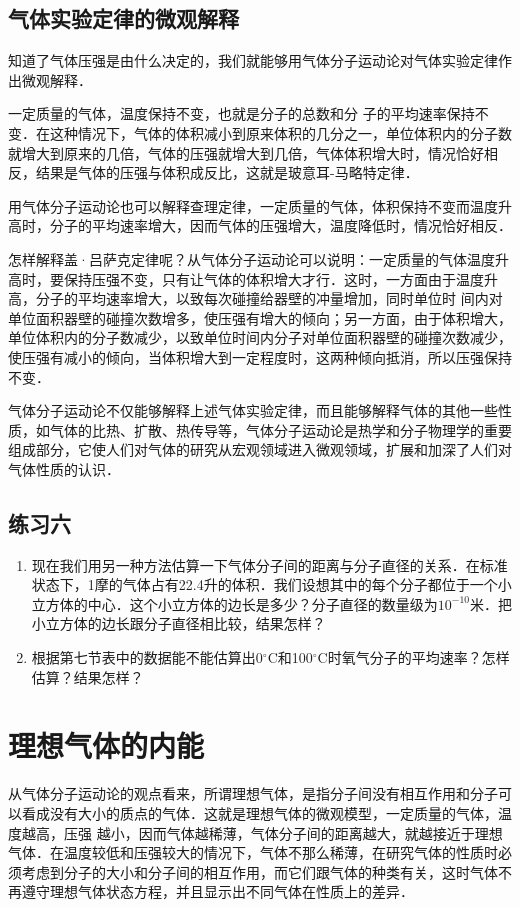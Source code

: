\subsection{气体实验定律的微观解释} 
知道了气体压强是由什么决定的，我们就能够用气体分子运动论对气体实验定律作出微观解释．

一定质量的气体，温度保持不变，也就是分子的总数和分
子的平均速率保持不变．在这种情况下，气体的体积减小到原来体积的几分之一，单位体积内的分子数就增大到原来的几倍，气体的压强就增大到几倍，气体体积增大时，情况恰好相反，结果是气体的压强与体积成反比，这就是玻意耳-马略特定律．

用气体分子运动论也可以解释查理定律，一定质量的气体，体积保持不变而温度升高时，分子的平均速率增大，因而气体的压强增大，温度降低时，情况恰好相反．

怎样解释盖·吕萨克定律呢？从气体分子运动论可以说明：一定质量的气体温度升高时，要保持压强不变，只有让气体的体积增大才行．这时，一方面由于温度升高，分子的平均速率增大，以致每次碰撞给器壁的冲量增加，同时单位时
间内对单位面积器壁的碰撞次数增多，使压强有增大的倾向；另一方面，由于体积增大，单位体积内的分子数减少，以致单位时间内分子对单位面积器壁的碰撞次数减少，使压强有减小的倾向，当体积增大到一定程度时，这两种倾向抵消，所以压强保持不变．

气体分子运动论不仅能够解释上述气体实验定律，而且能够解释气体的其他一些性质，如气体的比热、扩散、热传导等，气体分子运动论是热学和分子物理学的重要组成部分，它使人们对气体的研究从宏观领域进入微观领域，扩展和加深了人们对气体性质的认识．


\subsection*{练习六}

\begin{enumerate}
	\item 现在我们用另一种方法估算一下气体分子间的距离与分子直径的关系．在标准状态下，1摩的气体占有22.4升的体积．我们设想其中的每个分子都位于一个小立方体的中心．这个小立方体的边长是多少？分子直径的数量级为$10^{-10}$米．把小立方体的边长跟分子直径相比较，结果怎样？
\item 根据第七节表中的数据能不能估算出0$^\circ$C和100$^\circ$C时氧气分子的平均速率？怎样估算？结果怎样？
\end{enumerate}

\section{理想气体的内能}
从气体分子运动论的观点看来，所谓理想气体，是指分子间没有相互作用和分子可以看成没有大小的质点的气体．这就是理想气体的微观模型，一定质量的气体，温度越高，压强
越小，因而气体越稀薄，气体分子间的距离越大，就越接近于理想气体．在温度较低和压强较大的情况下，气体不那么稀薄，在研究气体的性质时必须考虑到分子的大小和分子间的相互作用，而它们跟气体的种类有关，这时气体不再遵守理想气体状态方程，并且显示出不同气体在性质上的差异．

